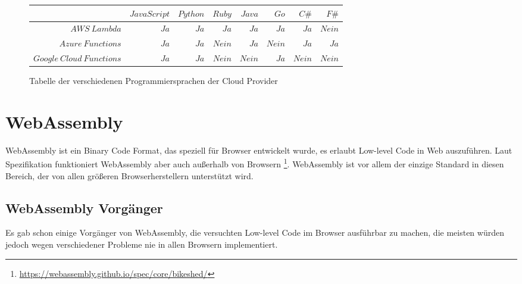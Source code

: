 \begin{figure}[ht]
	\centering
	\begin{tabular}{r|rrrrrrr}
		                  & $JavaScript$ & $Python$ & $Ruby$ & $Java$ & $Go$ & $C\#$ & $F\#$ \\ \hline
		$AWS\ Lambda$      & $Ja$         & $Ja$     & $Ja$   & $Ja$   & $Ja$ & $Ja$ & $Nein$ \\
		$Azure\ Functions$ & $Ja$         & $Ja$     & $Nein$ & $Ja$   &$Nein$& $Ja$ & $Ja$ \\
		$Google\ Cloud\ Functions$ & $Ja$ & $Ja$ & $Nein$ & $Nein$ & $Ja$ & $Nein$ & $Nein$
	\end{tabular}
	\caption{
		Tabelle der verschiedenen Programmiersprachen der Cloud Provider
	}
	\label{table:ProgrammingLang}
\end{figure}

\section{WebAssembly}
\label{section:WebAssembly}

WebAssembly ist ein Binary Code Format, das speziell für Browser entwickelt wurde, es erlaubt Low-level Code in Web auszuführen. Laut Spezifikation funktioniert WebAssembly aber auch außerhalb von Browsern \footnote{\url{https://webassembly.github.io/spec/core/bikeshed/}}. WebAssembly ist vor allem der einzige Standard in diesen Bereich, der von allen größeren Browserherstellern unterstützt wird.

\subsection{WebAssembly Vorgänger}

Es gab schon einige Vorgänger von WebAssembly, die versuchten Low-level Code im Browser ausführbar zu machen, die meisten würden jedoch wegen verschiedener Probleme nie in allen Browsern implementiert. \autocite[]{Haas2017}

